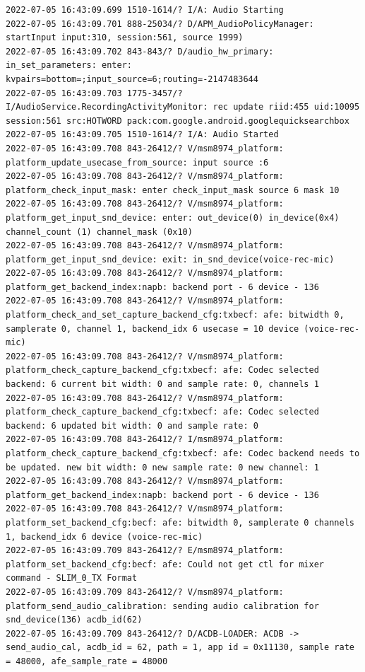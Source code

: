 \documentclass[a4paper,12pt]{book}
\begin{document}
\begin{lstlisting}
2022-07-05 16:43:09.699 1510-1614/? I/A: Audio Starting
2022-07-05 16:43:09.701 888-25034/? D/APM_AudioPolicyManager: startInput input:310, session:561, source 1999)
2022-07-05 16:43:09.702 843-843/? D/audio_hw_primary: in_set_parameters: enter: kvpairs=bottom=;input_source=6;routing=-2147483644
2022-07-05 16:43:09.703 1775-3457/? I/AudioService.RecordingActivityMonitor: rec update riid:455 uid:10095 session:561 src:HOTWORD pack:com.google.android.googlequicksearchbox
2022-07-05 16:43:09.705 1510-1614/? I/A: Audio Started
2022-07-05 16:43:09.708 843-26412/? V/msm8974_platform: platform_update_usecase_from_source: input source :6
2022-07-05 16:43:09.708 843-26412/? V/msm8974_platform: platform_check_input_mask: enter check_input_mask source 6 mask 10
2022-07-05 16:43:09.708 843-26412/? V/msm8974_platform: platform_get_input_snd_device: enter: out_device(0) in_device(0x4) channel_count (1) channel_mask (0x10)
2022-07-05 16:43:09.708 843-26412/? V/msm8974_platform: platform_get_input_snd_device: exit: in_snd_device(voice-rec-mic)
2022-07-05 16:43:09.708 843-26412/? V/msm8974_platform: platform_get_backend_index:napb: backend port - 6 device - 136 
2022-07-05 16:43:09.708 843-26412/? V/msm8974_platform: platform_check_and_set_capture_backend_cfg:txbecf: afe: bitwidth 0, samplerate 0, channel 1, backend_idx 6 usecase = 10 device (voice-rec-mic)
2022-07-05 16:43:09.708 843-26412/? V/msm8974_platform: platform_check_capture_backend_cfg:txbecf: afe: Codec selected backend: 6 current bit width: 0 and sample rate: 0, channels 1
2022-07-05 16:43:09.708 843-26412/? V/msm8974_platform: platform_check_capture_backend_cfg:txbecf: afe: Codec selected backend: 6 updated bit width: 0 and sample rate: 0
2022-07-05 16:43:09.708 843-26412/? I/msm8974_platform: platform_check_capture_backend_cfg:txbecf: afe: Codec backend needs to be updated. new bit width: 0 new sample rate: 0 new channel: 1
2022-07-05 16:43:09.708 843-26412/? V/msm8974_platform: platform_get_backend_index:napb: backend port - 6 device - 136 
2022-07-05 16:43:09.708 843-26412/? V/msm8974_platform: platform_set_backend_cfg:becf: afe: bitwidth 0, samplerate 0 channels 1, backend_idx 6 device (voice-rec-mic)
2022-07-05 16:43:09.709 843-26412/? E/msm8974_platform: platform_set_backend_cfg:becf: afe: Could not get ctl for mixer command - SLIM_0_TX Format
2022-07-05 16:43:09.709 843-26412/? V/msm8974_platform: platform_send_audio_calibration: sending audio calibration for snd_device(136) acdb_id(62)
2022-07-05 16:43:09.709 843-26412/? D/ACDB-LOADER: ACDB -> send_audio_cal, acdb_id = 62, path = 1, app id = 0x11130, sample rate = 48000, afe_sample_rate = 48000

\end{lstlisting}
\end{document}
